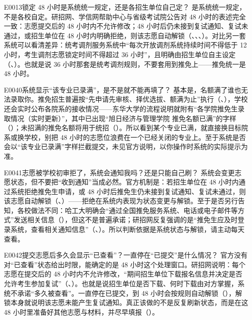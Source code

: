 \begin{qa}{E0013}{锁定 48 小时是系统统一规定，还是各招生单位自己定？}
是系统统一规定，不是各校自定。研招网、学信网帮助中心与省级考试院公告对 48 小时的表述完全一致：志愿提交后的 48 小时内不允许修改；48 小时后仍未接到复试通知、复试未通过，或招生单位在 48 小时内明确拒绝，则该志愿自动解锁（、、、）。对比另一套系统可以看清差异：统考调剂服务系统中“每次开放调剂系统持续时间不得低于 12 小时，考生调剂志愿锁定时间不得超过 36 小时”，且明确由招生单位自主设定（、）。也就是说 36 小时那套是统考调剂规则，不要套用到推免上——推免统一是 48 小时。
\end{qa}

\begin{qa}{E0040}{系统显示“该专业已录满”，是不是就不能再填了？}
基本是，名额满了谁也无法录取你。推免招生普遍按“先申请先审核、择优选拔、额满为止”执行（、），学校还会实时公布各院系的接收情况——东华大学的流程说明就附有“各学院推免生录取情况（实时更新）”，其中已出现“旭日经济与管理学院 推免名额已满”的字样（）；未招满的推免名额将用于统招（）。所以看到某个专业已满，就直接换目标院系或换学校，别把 48 小时的志愿位浪费在一个已经关闭的专业上。至于系统是否会以“该专业已录满”字样拦截提交，未见官方说明，以你操作时系统的实际提示为准。
\end{qa}

\begin{qa}{E0041}{志愿被学校初审拒了，系统会通知我吗？还是只能自己刷？}
系统会变更志愿状态，但不要把“收到通知”当成必然。官方机制是：若招生单位在 48 小时内通过系统拒绝推免生申请，或 48 小时后推免生仍未接到复试通知、复试未通过，则该志愿自动解锁（、）——拒绝在系统内表现为状态变更与解锁。至于是否另行告知，各校做法不同：哈工大明确会“通过全国推免服务系统、电话或电子邮件等方式”发送相关信息（），但这不是普遍承诺；研招网反复强调的是“推免生应及时登录系统，查看相关通知信息”（、）。所以判断依据是系统状态与解锁，请主动每天查看。
\end{qa}

\begin{qa}{E0042}{提交志愿后多久会显示“已查看”？一直停在“已提交”是什么情况？}
官方没有对“已查看”状态给出时限，能确定的是 48 小时这个处理窗口。研招网说明：每个志愿在提交后的 48 小时内不允许修改，“期间招生单位下载报名信息并决定是否允许考生参加复试”（、）。也就是说招生单位是否下载、何时下载由对方掌握，系统不承诺“多久被查看”。一直停在已提交，到 48 小时会按规则自动解锁（），解锁本身就说明该志愿未能产生复试通知。真正该做的不是反复刷新状态，而是在这 48 小时里准备好其他志愿与材料，并尽早填报（）。
\end{qa}

